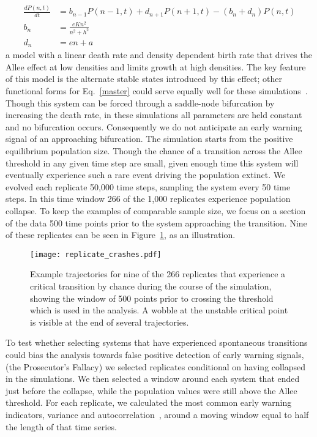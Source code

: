 \documentclass[authoryear,review,12pt]{elsarticle}
\begin{document}
\begin{align}
  \frac{dP(n,t)}{dt} &= b_{n-1} P(n-1,t) + d_{n+1}P(n+1,t) - (b_n+d_n) P(n,t)  \label{master} \\
    b_n &= \frac{e K n^2}{n^2 + h^2} \\
    d_n &= e n + a
\end{align}
a model with a linear death rate and density dependent birth rate
that drives the Allee effect at low densities and limits growth
at high densities.  The key feature of this model is the alternate
stable states introduced by this effect; other functional forms for
Eq.~\ref{master} could serve equally well for these simulations~\citep[see
\emph{e.g.}][]{Scheffer2001}.  Though this system can be forced
through a saddle-node bifurcation by increasing the death rate, in
these simulations all parameters are held constant and no bifurcation
occurs.  Consequently we do not anticipate an early warning signal of
an approaching bifurcation.  The simulation starts from the positive
equilibrium population size.  Though the chance of a transition across
the Allee threshold in any given time step are small, given enough
time this system will eventually experience such a rare event driving
the population extinct.  We evolved each replicate 50,000 time steps,
sampling the system every 50 time steps.  In this time window 266 of the
1,000 replicates experience population collapse.  To keep the examples of
comparable sample size, we focus on a section of the data 500 time points
prior to the system approaching the transition.  Nine of these replicates
can be seen in Figure~\ref{fig:replicate_crashes}, as an illustration.

  \begin{figure}
    \begin{center}
      \texttt{[image: replicate\_crashes.pdf]}
    \end{center}
    \caption{Example trajectories for nine of the 266 replicates that 
             experience a critical transition by chance during the course
             of the simulation, showing the window of 500 points prior to
             crossing the threshold which is used in the analysis.  A wobble
             at the unstable critical point is visible at the end of several 
             trajectories.}
    \label{fig:replicate_crashes}
  \end{figure}


To test whether selecting systems that have experienced spontaneous transitions
could bias the analysis towards false positive detection of early warning signals,
(the Prosecutor's Fallacy) we selected replicates conditional on having collapsed
in the simulations.
We then selected a window around each system that ended just before the
collapse, while the population values were still above the Allee threshold.
For each replicate, we calculated the most common early warning indicators, variance
and autocorrelation~\citep[\emph{e.g.}][]{Carpenter2006,Dakos2008,Scheffer2009}, 
around a moving window equal to half the length of that time series.  
\end{document}

